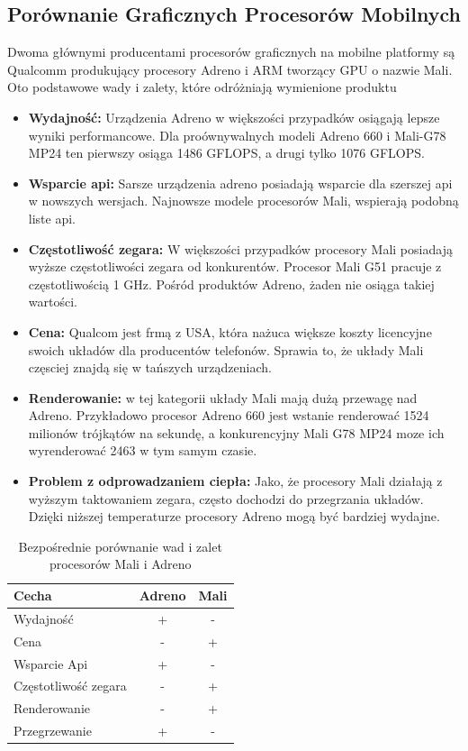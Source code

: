 \subsection[Porównanie Graficznych Procesorów Mobilnych]{Porównanie Graficznych Procesorów Mobilnych}
Dwoma głównymi producentami procesorów graficznych na mobilne platformy są Qualcomm produkujący procesory Adreno i ARM tworzący GPU o nazwie Mali. 
Oto podstawowe wady i zalety, które odróżniają wymienione produktu
\begin{itemize}
	\item \textbf{Wydajność:} Urządzenia Adreno w większości przypadków osiągają lepsze wyniki performancowe. Dla proównywalnych modeli Adreno 660 i Mali-G78 MP24 ten pierwszy osiąga 1486 GFLOPS, a drugi tylko 1076 GFLOPS.
	\item \textbf{Wsparcie api:} Sarsze urządzenia adreno posiadają wsparcie dla szerszej api w nowszych wersjach. Najnowsze modele procesorów Mali, wspierają podobną liste api.
	\item \textbf{Częstotliwość zegara:} W większości przypadków procesory Mali posiadają wyższe częstotliwości zegara od konkurentów. Procesor Mali G51 pracuje z częstotliwością 1 GHz. Pośród produktów Adreno, żaden nie osiąga takiej wartości.
	\item \textbf{Cena:} Qualcom jest frmą z USA, która nażuca większe koszty licencyjne swoich układów dla producentów telefonów. Sprawia to, że układy Mali częsciej znajdą się w tańszych urządzeniach.
	\item \textbf{Renderowanie:} w tej kategorii układy Mali mają dużą przewagę nad Adreno. Przykładowo procesor Adreno 660 jest wstanie renderować 1524 milionów trójkątów na sekundę, a konkurencyjny Mali G78 MP24 moze ich wyrenderować 2463 w tym samym czasie.
	\item \textbf{Problem z odprowadzaniem ciepła:} Jako, że procesory Mali działają z wyższym taktowaniem zegara, często dochodzi do przegrzania układów. Dzięki niższej temperaturze procesory Adreno mogą być bardziej wydajne.
\end{itemize}
\begin{table}[H]
    \caption{Bezpośrednie porównanie wad i zalet procesorów Mali i Adreno}
    \label{tab:skale}
    \begin{tabular}{|l|c|c|}
\hline
Cecha & Adreno & Mali\\
\hline
Wydajność & + & -\\
\hline
Cena & - & + \\
\hline
Wsparcie Api & + & -\\
\hline
Częstotliwość zegara & - & +\\
\hline
Renderowanie & - & +\\
\hline
Przegrzewanie & + & -\\
\hline
\end{tabular}
\end{table}
	
